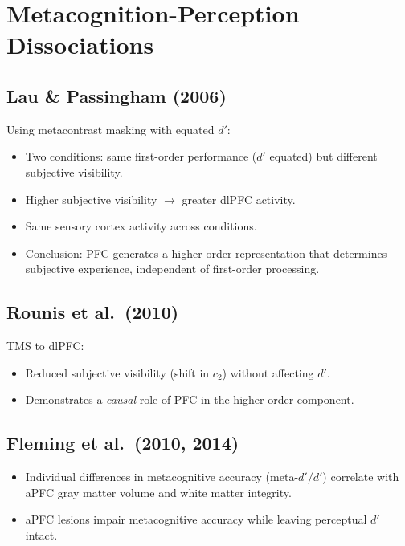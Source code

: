\documentclass[11pt,a4paper]{report}
\begin{document}
\section{Metacognition-Perception Dissociations}

\subsection{Lau \& Passingham (2006)}

Using metacontrast masking with equated $d'$:
\begin{itemize}[leftmargin=1.5em]
  \item Two conditions: same first-order performance ($d'$ equated) but different subjective visibility.
  \item Higher subjective visibility $\to$ greater dlPFC activity.
  \item Same sensory cortex activity across conditions.
  \item Conclusion: PFC generates a higher-order representation that determines subjective experience, independent of first-order processing.
\end{itemize}

\subsection{Rounis et al.\ (2010)}

TMS to dlPFC:
\begin{itemize}[leftmargin=1.5em]
  \item Reduced subjective visibility (shift in $c_2$) without affecting $d'$.
  \item Demonstrates a \emph{causal} role of PFC in the higher-order component.
\end{itemize}

\subsection{Fleming et al.\ (2010, 2014)}

\begin{itemize}[leftmargin=1.5em]
  \item Individual differences in metacognitive accuracy (meta-$d'/d'$) correlate with aPFC gray matter volume and white matter integrity.
  \item aPFC lesions impair metacognitive accuracy while leaving perceptual $d'$ intact.
\end{itemize}
\end{document}
